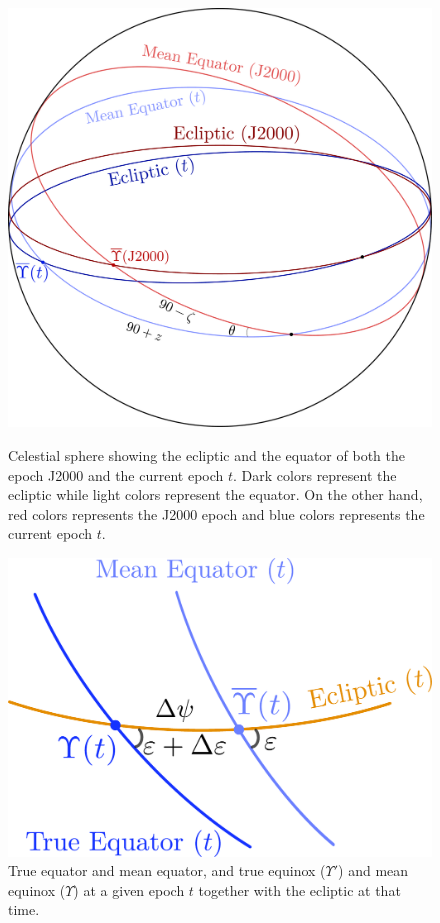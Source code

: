 \documentclass[../main.tex]{subfiles}
\begin{document}
\begin{figure}[htbp]
  \centering
  \begin{minipage}[t]{0.45\textwidth}
    \centering
    \includegraphics[width=\textwidth]{Images/ecliptic_equator.pdf}
    \caption{Celestial sphere showing the ecliptic and the equator of both the epoch J2000 and the current epoch $t$. Dark colors represent the ecliptic while light colors represent the equator. On the other hand, red colors represents the J2000 epoch and blue colors represents the current epoch $t$.}
    \label{fig:precession_matrix}
  \end{minipage}
  \hfill
  \begin{minipage}[t]{0.45\textwidth}
    \centering
    \includegraphics[width=\textwidth]{Images/nutation_matrix.pdf}
    \caption{True equator and mean equator, and true equinox ($\Upsilon'$) and mean equinox ($\Upsilon$) at a given epoch $t$ together with the ecliptic at that time.}
    \label{fig:nutation_matrix}
  \end{minipage}
\end{figure}
\end{document}
